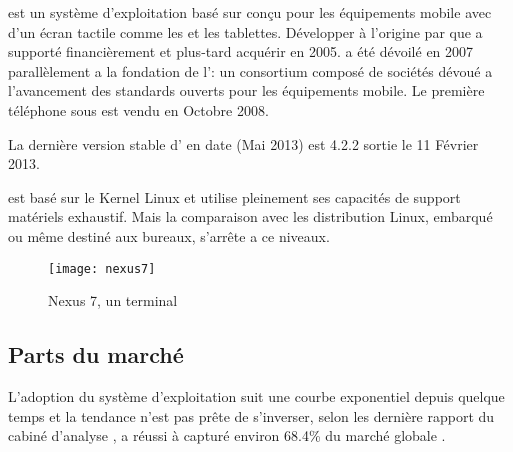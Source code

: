\android{} est un système d'exploitation basé sur  conçu pour les
équipements mobile avec d'un écran tactile comme les  et les
tablettes. Développer à l'origine par  que  a
supporté financièrement et plus-tard acquérir en 2005. \android{} a été
dévoilé en 2007 parallèlement a la fondation de l':
un consortium composé de sociétés dévoué a l'avancement des standards ouverts
pour les équipements mobile. Le première téléphone sous \android{} est vendu
en Octobre 2008.

La dernière version stable d'\android{} en date (Mai 2013) est 4.2.2  sortie le 11 Février 2013.

\android{} est basé sur le Kernel Linux et utilise pleinement ses capacités de support matériels exhaustif. Mais la comparaison avec les distribution Linux, embarqué ou même destiné aux bureaux, s'arrête a ce niveaux.~\cite{lft:growth_android}

\begin{figure}
\centering
\texttt{[image: nexus7]}
\caption{ Nexus 7, un terminal \android}
\end{figure}

\subsection{Parts du marché}
L’adoption du système d'exploitation \android suit une courbe exponentiel depuis quelque temps et la tendance n'est pas prête de s’inverser, selon les dernière rapport du cabiné d'analyse , \android a réussi à capturé environ 68.4\% du marché globale \cite{venturebeat.com}.

